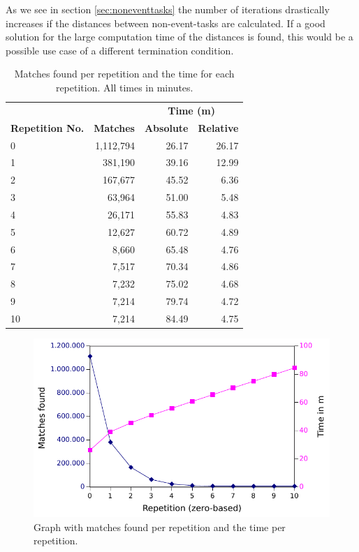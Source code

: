 As we see in section \ref{sec:noneventtasks} the number of iterations drastically increases if the distances between non-event-tasks are calculated.
If a good solution for the large computation time of the distances is found, this would be a possible use case of a different termination condition.

\begin{table}[h!]
		\centering
	\begin{tabular}{ l r r r }
		  \toprule
			& & \multicolumn{2}{c}{\textbf{Time (m)}} \\
			\cmidrule{3-4}
		  \textbf{Repetition No.} & \textbf{Matches} & \textbf{Absolute}& \textbf{Relative} \\
		  \midrule
     		    0  & 1,112,794 & 26.17 & 26.17\\
	            1  & 381,190   & 39.16 & 12.99\\
		    2  & 167,677   & 45.52 & 6.36\\
		    3  & 63,964    & 51.00 & 5.48\\
		    4  & 26,171    & 55.83 & 4.83\\
		    5  & 12,627    & 60.72 & 4.89\\
		    6  & 8,660     & 65.48 & 4.76\\
		    7  & 7,517     & 70.34 & 4.86\\
		    8  & 7,232     & 75.02 & 4.68\\
		    9  & 7,214     & 79.74 & 4.72\\
		    10 & 7,214     & 84.49 & 4.75\\
		  \bottomrule
		   \end{tabular}
		   \caption{Matches found per repetition and the time for each repetition. All times in minutes.}
		   \label{tab:timesandmatchesperiteration} %
	\end{table}
	\begin{figure}[h!]
		\centering
		\includegraphics[]{chapters/casestudy/hasehase.pdf}
		\caption{Graph with matches found per repetition and the time per repetition.}
		\label{fig:hasehase}
	\end{figure}


